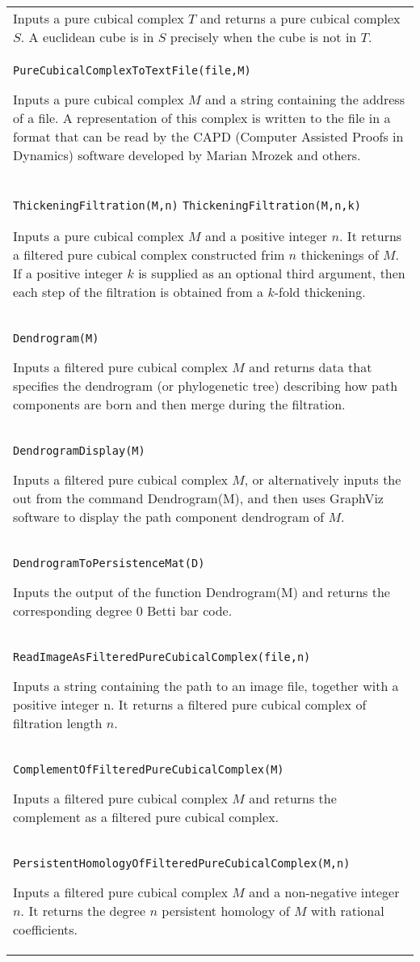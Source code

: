 \documentclass[a4paper,11pt]{report}
\begin{document}
{\begin{center}
\begin{tabular}{|l|}
 Inputs a pure cubical complex $T$ and returns a pure cubical complex $S$. A euclidean cube is in $S$ precisely when the cube is not in $T$. \\
 \index{PureCubicalComplexToTextFile} \texttt{PureCubicalComplexToTextFile(file,M)} 

 Inputs a pure cubical complex $M$ and a string containing the address of a file. A representation of this
complex is written to the file in a format that can be read by the CAPD
(Computer Assisted Proofs in Dynamics) software developed by Marian Mrozek and
others. \\
 \index{ThickeningFiltration} \texttt{ThickeningFiltration(M,n)} \texttt{ThickeningFiltration(M,n,k)} 

 Inputs a pure cubical complex $M$ and a positive integer $n$. It returns a filtered pure cubical complex constructed frim $n$ thickenings of $M$. If a positive integer $k$ is supplied as an optional third argument, then each step of the filtration is
obtained from a $k$-fold thickening. \\
 \index{Dendrogram} \texttt{Dendrogram(M)} 

 Inputs a filtered pure cubical complex $M$ and returns data that specifies the dendrogram (or phylogenetic tree)
describing how path components are born and then merge during the filtration. \\
 \index{DendrogramDisplay} \texttt{DendrogramDisplay(M)} 

 Inputs a filtered pure cubical complex $M$, or alternatively inputs the out from the command Dendrogram(M), and then
uses GraphViz software to display the path component dendrogram of $M$. \\
 \index{DendrogramToPersistenceMat} \texttt{DendrogramToPersistenceMat(D)} 

 Inputs the output of the function Dendrogram(M) and returns the corresponding
degree 0 Betti bar code. \\
 \index{ReadImageAsFilteredPureCubicalComplex} \texttt{ReadImageAsFilteredPureCubicalComplex(file,n)} 

 Inputs a string containing the path to an image file, together with a positive
integer n. It returns a filtered pure cubical complex of filtration length $n$. \\
 \index{ComplementOfFilteredPureCubicalComplex} \texttt{ComplementOfFilteredPureCubicalComplex(M)} 

 Inputs a filtered pure cubical complex $M$ and returns the complement as a filtered pure cubical complex. \\
 \index{PersistentHomologyOfFilteredPureCubicalComplex} \texttt{PersistentHomologyOfFilteredPureCubicalComplex(M,n)} 

 Inputs a filtered pure cubical complex $M$ and a non-negative integer $n$. It returns the degree $n$ persistent homology of $ M$ with rational coefficients. \\
\end{tabular}\\[2mm]
\end{center}

 }
\end{document}
